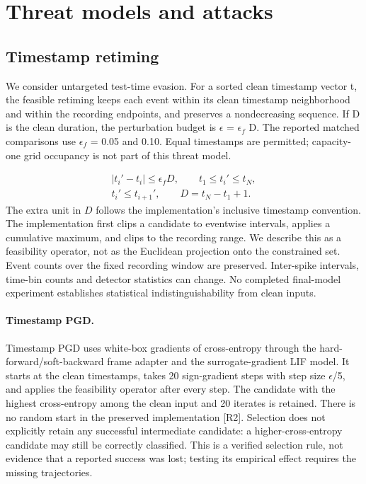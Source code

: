 \section{Threat models and attacks}\label{sec:attacks}
\subsection{Timestamp retiming}
We consider untargeted test-time evasion. For a sorted clean timestamp vector t, the feasible retiming keeps each event within its clean timestamp neighborhood and within the recording endpoints, and preserves a nondecreasing sequence. If D is the clean duration, the perturbation budget is $\epsilon$ = $\epsilon_f$ D. The reported matched comparisons use $\epsilon_f$ = 0.05 and 0.10. Equal timestamps are permitted; capacity-one grid occupancy is not part of this threat model.


\begin{equation}\label{eq:feasible}
\begin{gathered}
|t_i'-t_i|\leq\epsilon_f D,\qquad t_1\leq t_i'\leq t_N,\\
 t_i'\leq t_{i+1}',\qquad D=t_N-t_1+1.
\end{gathered}
\end{equation}
The extra unit in $D$ follows the implementation's inclusive timestamp convention.
The implementation first clips a candidate to eventwise intervals, applies a cumulative maximum, and clips to the recording range. We describe this as a feasibility operator, not as the Euclidean projection onto the constrained set. Event counts over the fixed recording window are preserved. Inter-spike intervals, time-bin counts and detector statistics can change. No completed final-model experiment establishes statistical indistinguishability from clean inputs.


\paragraph{Timestamp PGD.}
Timestamp PGD uses white-box gradients of cross-entropy through the hard-forward/soft-backward frame adapter and the surrogate-gradient LIF model. It starts at the clean timestamps, takes 20 sign-gradient steps with step size $\epsilon$/5, and applies the feasibility operator after every step. The candidate with the highest cross-entropy among the clean input and 20 iterates is retained. There is no random start in the preserved implementation [R2]. Selection does not explicitly retain any successful intermediate candidate: a higher-cross-entropy candidate may still be correctly classified. This is a verified selection rule, not evidence that a reported success was lost; testing its empirical effect requires the missing trajectories.


